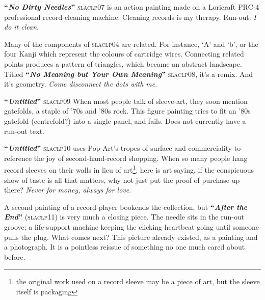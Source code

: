 \documentclass[a3paper]{article}
\begin{document}
\begin{multicols}{5}
\textbf{``\textit{No Dirty Needles}''} \textsc{slaclp07} is an action painting
  made on a Loricraft PRC-4 professional record-cleaning machine. Cleaning
  records is my therapy. Run-out: \textit{I do it clean}.

Many of the components of \textsc{slaclp04} are related. For instance, `A' and
  `b', or the four Kanji which represent the colours of cartridge wires.
  Connecting related points produces a pattern of triangles, which became an
  abstract landscape.  Titled \textbf{``\textit{No Meaning but Your Own
  Meaning}''} \textsc{slaclp08}, it's a remix. And it's geometry.
  \textit{Come disconnect the dots with me}.

\textbf{``\textit{Untitled}''} \textsc{slaclp09} When most people talk of
  sleeve-art, they soon mention gatefolds, a staple of '70s and '80s rock.
  This figure painting tries to fit an '80s gatefold (centrefold?) into a
  single panel, and fails. Does not currently have a run-out text.

\textbf{``\textit{Untitled}''} \textsc{slaclp10} uses Pop-Art's tropes of
  surface and commerciality to reference the joy of second-hand-record
  shopping.  When so many people hang record sleeves on their walls in lieu of
  art\footnote{the original work used on a record sleeve may be a piece of
  art, but the sleeve itself is packaging},  here is art saying, if the
  conspicuous show of taste is all that matters, why not just put the proof of
  purchase up there? \textit{Never for money, always for love}.

A second painting of a record-player bookends the collection, but
  \textbf{``\textit{After the End}''} (\textsc{slaclp11}) is very much a
  closing piece. The needle sits in the run-out groove; a life-support machine
  keeping the clicking heartbeat going until someone pulls the plug. What
  comes next? This picture already existed, as a painting and a photograph. It
  is a pointless reissue of something no one much cared about before.

\end{multicols}
\end{document}
